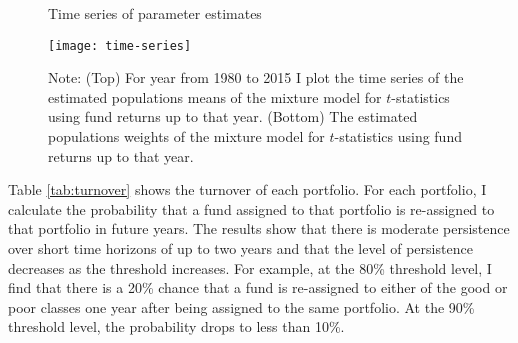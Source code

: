 
\begin{figure}[ht!]
\small
\centering
\captionsetup{labelsep=colon, font=footnotesize, justification=centerfirst, width=\linewidth}
\caption{Time series of parameter estimates}
\label{fig:estimates}
\centering
\texttt{[image: time-series]}
\captionsetup{font=footnotesize, justification=justified, width=\textwidth}
\caption*{Note: (Top) For year from 1980 to 2015 I plot the time series of the estimated populations means of the mixture model for $t$-statistics using fund returns up to that year. (Bottom) The estimated populations weights of the mixture model for $t$-statistics using fund returns up to that year.}
\end{figure}

Table \ref{tab:turnover} shows the turnover of each portfolio.  For each portfolio, I calculate the probability that a fund assigned to that portfolio is re-assigned to that portfolio in future years.  The results show that there is moderate persistence over short time horizons of up to two years and that the level of persistence decreases as the threshold increases. For example, at the 80\% threshold level, I find that there is a 20\% chance that a fund is re-assigned to either of the good or poor classes one year after being assigned to the same portfolio.  At the 90\% threshold level, the probability drops to less than 10\%.

